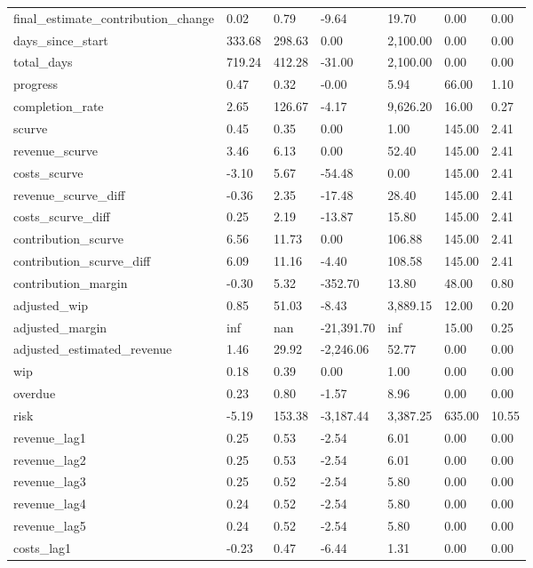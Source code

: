 \begin{landscape}
\begin{longtable}[h!]{lllllll}
final_estimate_contribution_change & 0.02 & 0.79 & -9.64 & 19.70 & 0.00 & 0.00 \\
days_since_start & 333.68 & 298.63 & 0.00 & 2,100.00 & 0.00 & 0.00 \\
total_days & 719.24 & 412.28 & -31.00 & 2,100.00 & 0.00 & 0.00 \\
progress & 0.47 & 0.32 & -0.00 & 5.94 & 66.00 & 1.10 \\
completion_rate & 2.65 & 126.67 & -4.17 & 9,626.20 & 16.00 & 0.27 \\
scurve & 0.45 & 0.35 & 0.00 & 1.00 & 145.00 & 2.41 \\
revenue_scurve & 3.46 & 6.13 & 0.00 & 52.40 & 145.00 & 2.41 \\
costs_scurve & -3.10 & 5.67 & -54.48 & 0.00 & 145.00 & 2.41 \\
revenue_scurve_diff & -0.36 & 2.35 & -17.48 & 28.40 & 145.00 & 2.41 \\
costs_scurve_diff & 0.25 & 2.19 & -13.87 & 15.80 & 145.00 & 2.41 \\
contribution_scurve & 6.56 & 11.73 & 0.00 & 106.88 & 145.00 & 2.41 \\
contribution_scurve_diff & 6.09 & 11.16 & -4.40 & 108.58 & 145.00 & 2.41 \\
contribution_margin & -0.30 & 5.32 & -352.70 & 13.80 & 48.00 & 0.80 \\
adjusted_wip & 0.85 & 51.03 & -8.43 & 3,889.15 & 12.00 & 0.20 \\
adjusted_margin & inf & nan & -21,391.70 & inf & 15.00 & 0.25 \\
adjusted_estimated_revenue & 1.46 & 29.92 & -2,246.06 & 52.77 & 0.00 & 0.00 \\
wip & 0.18 & 0.39 & 0.00 & 1.00 & 0.00 & 0.00 \\
overdue & 0.23 & 0.80 & -1.57 & 8.96 & 0.00 & 0.00 \\
risk & -5.19 & 153.38 & -3,187.44 & 3,387.25 & 635.00 & 10.55 \\
revenue_lag1 & 0.25 & 0.53 & -2.54 & 6.01 & 0.00 & 0.00 \\
revenue_lag2 & 0.25 & 0.53 & -2.54 & 6.01 & 0.00 & 0.00 \\
revenue_lag3 & 0.25 & 0.52 & -2.54 & 5.80 & 0.00 & 0.00 \\
revenue_lag4 & 0.24 & 0.52 & -2.54 & 5.80 & 0.00 & 0.00 \\
revenue_lag5 & 0.24 & 0.52 & -2.54 & 5.80 & 0.00 & 0.00 \\
costs_lag1 & -0.23 & 0.47 & -6.44 & 1.31 & 0.00 & 0.00 \\

\end{longtable}
\end{landscape}
